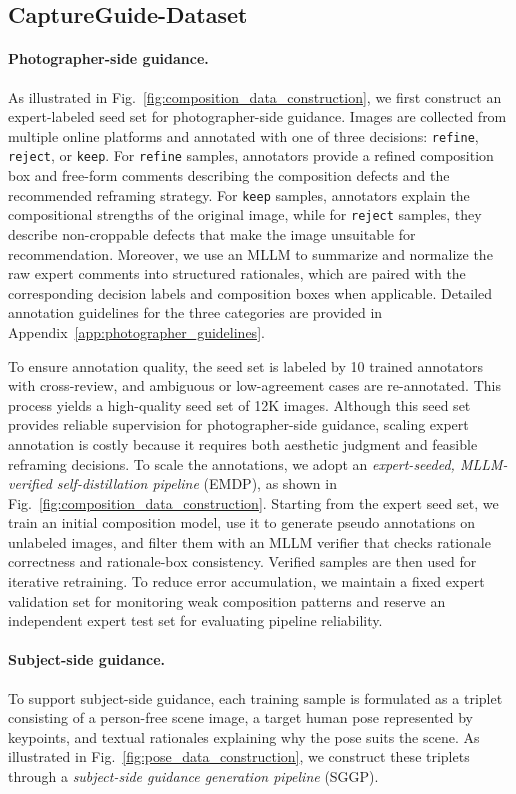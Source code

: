 \documentclass{article} %
\begin{document}
\subsection{CaptureGuide-Dataset}
\paragraph{Photographer-side guidance.}
As illustrated in Fig.~\ref{fig:composition_data_construction}, we first construct an expert-labeled seed set for photographer-side guidance. Images are collected from multiple online platforms and annotated with one of three decisions: \texttt{refine}, \texttt{reject}, or \texttt{keep}. For \texttt{refine} samples, annotators provide a refined composition box and free-form comments describing the composition defects and the recommended reframing strategy. For \texttt{keep} samples, annotators explain the compositional strengths of the original image, while for \texttt{reject} samples, they describe non-croppable defects that make the image unsuitable for recommendation. Moreover, we use an MLLM to summarize and normalize the raw expert comments into structured rationales, which are paired with the corresponding decision labels and composition boxes when applicable. Detailed annotation guidelines for the three categories are provided in Appendix~\ref{app:photographer_guidelines}.

To ensure annotation quality, the seed set is labeled by 10 trained annotators with cross-review, and ambiguous or low-agreement cases are re-annotated. This process yields a high-quality seed set of 12K images. Although this seed set provides reliable supervision for photographer-side guidance, scaling expert annotation is costly because it requires both aesthetic judgment and feasible reframing decisions. To scale the annotations, we adopt an \textit{expert-seeded, MLLM-verified self-distillation pipeline} (EMDP), as shown in Fig.~\ref{fig:composition_data_construction}. Starting from the expert seed set, we train an initial composition model, use it to generate pseudo annotations on unlabeled images, and filter them with an MLLM verifier that checks rationale correctness and rationale-box consistency. Verified samples are then used for iterative retraining. To reduce error accumulation, we maintain a fixed expert validation set for monitoring weak composition patterns and reserve an independent expert test set for evaluating pipeline reliability.


\paragraph{Subject-side guidance.}
To support subject-side guidance, each training sample is formulated as a triplet consisting of a person-free scene image, a target human pose represented by keypoints, and textual rationales explaining why the pose suits the scene. As illustrated in Fig.~\ref{fig:pose_data_construction}, we construct these triplets through a \textit{subject-side guidance generation pipeline} (SGGP).
\end{document}
